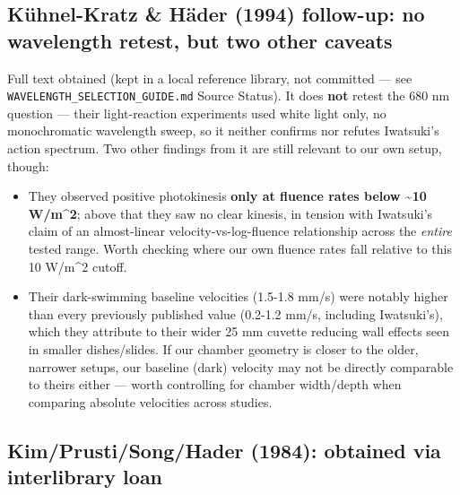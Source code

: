 \documentclass[
]{article}
\providecommand{\tightlist}{%
  \setlength{\itemsep}{0pt}\setlength{\parskip}{0pt}}
\begin{document}
\hypertarget{kuxfchnel-kratz-huxe4der-1994-follow-up-no-wavelength-retest-but-two-other-caveats}{%
\subsection{Kühnel-Kratz \& Häder (1994) follow-up: no wavelength
retest, but two other
caveats}\label{kuxfchnel-kratz-huxe4der-1994-follow-up-no-wavelength-retest-but-two-other-caveats}}

Full text obtained (kept in a local reference library, not committed ---
see \texttt{WAVELENGTH\_SELECTION\_GUIDE.md} Source Status). It does
\textbf{not} retest the 680 nm question --- their light-reaction
experiments used white light only, no monochromatic wavelength sweep, so
it neither confirms nor refutes Iwatsuki's action spectrum. Two other
findings from it are still relevant to our own setup, though:

\begin{itemize}
\tightlist
\item
  They observed positive photokinesis \textbf{only at fluence rates
  below \textasciitilde10 W/m\^{}2}; above that they saw no clear
  kinesis, in tension with Iwatsuki's claim of an almost-linear
  velocity-vs-log-fluence relationship across the \emph{entire} tested
  range. Worth checking where our own fluence rates fall relative to
  this 10 W/m\^{}2 cutoff.
\item
  Their dark-swimming baseline velocities (1.5-1.8 mm/s) were notably
  higher than every previously published value (0.2-1.2 mm/s, including
  Iwatsuki's), which they attribute to their wider 25 mm cuvette
  reducing wall effects seen in smaller dishes/slides. If our chamber
  geometry is closer to the older, narrower setups, our baseline (dark)
  velocity may not be directly comparable to theirs either --- worth
  controlling for chamber width/depth when comparing absolute velocities
  across studies.
\end{itemize}

\hypertarget{kimprustisonghader-1984-obtained-via-interlibrary-loan}{%
\subsection{Kim/Prusti/Song/Hader (1984): obtained via interlibrary
loan}\label{kimprustisonghader-1984-obtained-via-interlibrary-loan}}
\end{document}
